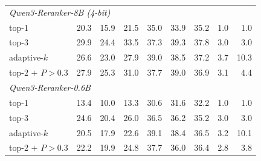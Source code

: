 \begin{table}[t]
\begin{tabular}{lrrrrrrrr}
\multicolumn{9}{l}{\textit{Qwen3-Reranker-8B (4-bit)}} \\
\quad top-1 & 20.3 & 15.9 & 21.5 & 35.0 & 33.9 & 35.2 & 1.0 & 1.0 \\
\quad top-3 & 29.9 & 24.4 & 33.5 & 37.3 & 39.3 & 37.8 & 3.0 & 3.0 \\
\quad adaptive-$k$ & 26.6 & 23.0 & 27.9 & 39.0 & 38.5 & 37.2 & 3.7 & 10.3 \\
\quad top-2 $+$ $P>0.3$ & 27.9 & 25.3 & 31.0 & 37.7 & 39.0 & 36.9 & 3.1 & 4.4 \\
\multicolumn{9}{l}{\textit{Qwen3-Reranker-0.6B}} \\
\quad top-1 & 13.4 & 10.0 & 13.3 & 30.6 & 31.6 & 32.2 & 1.0 & 1.0 \\
\quad top-3 & 24.6 & 20.4 & 26.0 & 36.5 & 36.2 & 35.2 & 3.0 & 3.0 \\
\quad adaptive-$k$ & 20.5 & 17.9 & 22.6 & 39.1 & 38.4 & 36.5 & 3.2 & 10.1 \\
\quad top-2 $+$ $P>0.3$ & 22.2 & 19.9 & 24.8 & 37.7 & 36.0 & 36.4 & 2.8 & 3.8 \\
\bottomrule
\end{tabular}
\end{table}